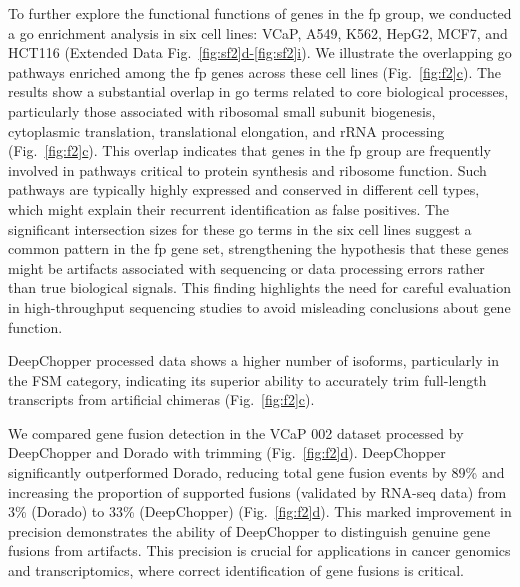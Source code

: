 \documentclass[pdflatex,sn-nature, lineno]{sn-jnl}%
\newcommand{\figref}[2]{Fig.~\hyperref[#1]{\ref*{#1}#2}}
\newcommand{\edfigrefrg}[3]{Extended Data Fig.~\hyperref[#1]{\ref*{#1}#2-\ref*{#1}#3}}
\theoremstyle{thmstyleone}%
\theoremstyle{thmstyletwo}%
\theoremstyle{thmstylethree}%
\begin{document}
To further explore the functional functions of genes in the \gls{fp} group, we conducted a \gls{go} enrichment analysis in six cell lines: VCaP, A549, K562, HepG2, MCF7, and HCT116 (\edfigrefrg{fig:sf2}{d}{i}).
We illustrate the overlapping \gls{go} pathways enriched among the \gls{fp} genes across these cell lines (\figref{fig:f2}{c}).
The results show a substantial overlap in \gls{go} terms related to core biological processes, particularly those associated with ribosomal small subunit biogenesis, cytoplasmic translation, translational elongation, and rRNA processing (\figref{fig:f2}{c}).
This overlap indicates that genes in the \gls{fp} group are frequently involved in pathways critical to protein synthesis and ribosome function.
Such pathways are typically highly expressed and conserved in different cell types, which might explain their recurrent identification as false positives.
The significant intersection sizes for these \gls{go} terms in the six cell lines suggest a common pattern in the \gls{fp} gene set, strengthening the hypothesis that these genes might be artifacts associated with sequencing or data processing errors rather than true biological signals.
This finding highlights the need for careful evaluation in high-throughput sequencing studies to avoid misleading conclusions about gene function.

DeepChopper processed data shows a higher number of isoforms, particularly in the FSM category, indicating its superior ability to accurately trim full-length transcripts from artificial chimeras (\figref{fig:f2}{c}).


We compared gene fusion detection in the VCaP 002 dataset processed by DeepChopper and Dorado with trimming (\figref{fig:f2}{d}).
DeepChopper significantly outperformed Dorado, reducing total gene fusion events by 89\% and increasing the proportion of supported fusions (validated by RNA-seq data) from 3\% (Dorado) to 33\% (DeepChopper)  (\figref{fig:f2}{d}).
This marked improvement in precision demonstrates the ability of DeepChopper to distinguish genuine gene fusions from artifacts.
This precision is crucial for applications in cancer genomics and transcriptomics, where correct identification of gene fusions is critical.
\end{document}
